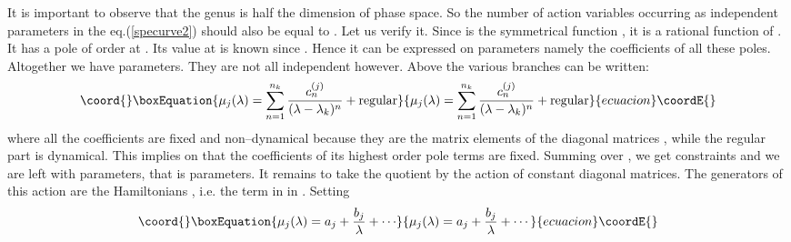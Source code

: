 \documentclass[a4paper,11pt]{article}
\begin{document}
It is important to observe that the
genus is  half the dimension of phase space.
So  the number of action variables occurring as
independent parameters in the eq.(\ref{specurve2}) should also
be equal to \coordHE{}.  Let us verify it. 
Since \coordHE{} is the symmetrical function
\coordHE{}, 
it is a  rational function of \myHighlight{$\lambda $}\coordHE{}.
It has a pole of order \coordHE{} at
\coordHE{}.
Its value at \myHighlight{$\lambda = \infty$}\coordHE{} is known since
\coordHE{}. Hence it can be expressed on \coordHE{} 
parameters
namely the coefficients of all these poles.  Altogether we have
\coordHE{} parameters. They are not all independent
however. Above \coordHE{} the various branches can be written:
\begin{equation}\coord{}\boxEquation{
\mu_j(\lambda)=\sum_{n=1}^{n_k} {c^{(j)}_n\over (\lambda -\lambda _k)^n}+{\rm
regular}
\label{cont1}
}{
\mu_j(\lambda)=\sum_{n=1}^{n_k} {c^{(j)}_n\over (\lambda -\lambda _k)^n}+{\rm
regular}
}{ecuacion}\coordE{}\end{equation} 
where all the coefficients \coordHE{}
are fixed and non--dynamical because they are the matrix elements of
the diagonal matrices \coordHE{}, while the regular part is
dynamical. This implies on \coordHE{} that the coefficients of its \coordHE{} highest 
order pole terms  are fixed. Summing over \coordHE{}, we get
\coordHE{} constraints and we are left with \coordHE{} 
parameters, that is \coordHE{} parameters.
It remains to take the quotient by the action of constant diagonal matrices.
The generators of this action are the Hamiltonians 
\coordHE{},
i.e. the term in \coordHE{} in \coordHE{}. 
Setting 
\begin{equation}\coord{}\boxEquation{
\mu_j(\lambda) = a_j + {b_j \over \lambda} + \cdots 
\label{cont2}
}{
\mu_j(\lambda) = a_j + {b_j \over \lambda} + \cdots 
}{ecuacion}\coordE{}\end{equation} 
\end{document}
